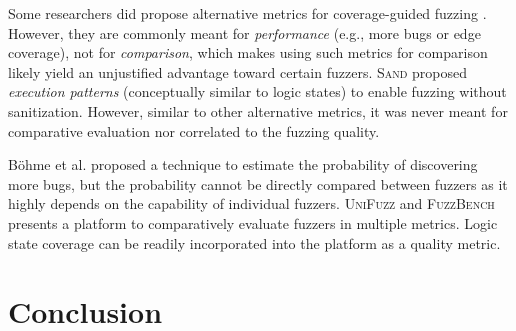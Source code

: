 \documentclass[letterpaper,twocolumn,10pt]{article}
\begin{document}
%
Some researchers did propose alternative metrics for coverage-guided fuzzing
\cite{wang2020notallcov,wang2019impactcov,yan2020pathafl,gan2020greyone,gan2018collafl}.
However, they are commonly meant for \emph{performance} (e.g., more bugs or edge
coverage), not for \emph{comparison}, which makes using such metrics for
comparison likely yield an unjustified advantage toward certain fuzzers.
%
\textsc{Sand} \cite{kong2024sand} proposed \emph{execution patterns}
(conceptually similar to logic states) to enable fuzzing without sanitization.
However, similar to other alternative metrics, it was never meant for
comparative evaluation nor correlated to the fuzzing quality. 

%
B\"{o}hme et al. \cite{bohme2021residual} proposed a technique to estimate the
probability of discovering more bugs,
but the probability cannot be directly compared between fuzzers as it highly
depends on the capability of individual fuzzers.
%
\textsc{UniFuzz} \cite{li2021unifuzz} and \textsc{FuzzBench}
\cite{metzman2021fuzzbench} presents a platform to comparatively evaluate
fuzzers in multiple metrics. 
%
Logic state coverage can be readily incorporated into the platform as a quality
metric.



\section{Conclusion}







\begin{appendix}

\end{appendix}
\end{document}
